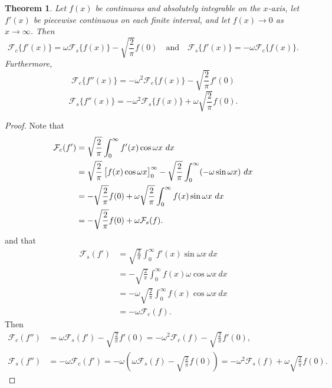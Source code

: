 \documentclass[12pt,openany]{book}
\newtheorem{theorem}{Theorem}[chapter]
\theoremstyle{definition}
\newcommand{\of}[1]{\left( #1 \right)}
\begin{document}
	\newpage
	\begin{tcolorbox}[colframe=thmcolor, title={\color{white}\bf Cosine and Sine Transforms of Derivatives}]
		\begin{theorem}
			Let \( f(x) \) be continuous and absolutely integrable on the \( x \)-axis, let \( f'(x) \) be piecewise continuous on each finite interval, and let \( f(x) \to 0 \) as \( x \to \infty \). Then
			\[
			\mathcal{F}_c \{ f'(x) \} = \omega\mathcal{F}_s \{ f(x) \} - \sqrt{\frac{2}{\pi}} f(0) \quad \text{and} \quad \mathcal{F}_s \{ f'(x) \} = -\omega\mathcal{F}_c \{ f(x) \}.
			\]
			Furthermore,
			\[
			\mathcal{F}_c \{ f''(x) \} = -\omega^2 \mathcal{F}_c \{ f(x) \} - \sqrt{\frac{2}{\pi}} f'(0)
			\]
			\[
			\mathcal{F}_s \{ f''(x) \} = -\omega^2 \mathcal{F}_s \{ f(x) \} + \omega \sqrt{\frac{2}{\pi}} f(0).
			\]
		\end{theorem}
	\end{tcolorbox}
	\begin{proof}
		Note that \begin{align*}
			\mathcal{F}_c(f')&=\sqrt{\frac{2}{\pi}}\int_0^\infty f'(x)\cos\omega x\ dx\\
			&=\sqrt{\frac{2}{\pi}}\sbr{f(x)\cos\omega x}_0^\infty - \sqrt{\frac{2}{\pi}}\int_0^\infty(-\omega\sin\omega x)\ dx\\
			&=-\sqrt{\frac{2}{\pi}}f(0)+\omega\sqrt{\frac{2}{\pi}}\int_0^\infty f(x)\sin\omega x\ dx\\
			&=-\sqrt{\frac{2}{\pi}}f(0)+\omega\mathcal{F}_s(f).
		\end{align*} and that \begin{align*}
		\mathcal{F}_s(f')&=\sqrt{\frac{2}{\pi}}\int_0^\infty f'(x)\sin\omega x\ dx\\
		&=-\sqrt{\frac{2}{\pi}}\int_0^\infty f(x)\omega\cos\omega x\ dx\\
		&=-\omega\sqrt{\frac{2}{\pi}}\int_0^\infty f(x)\cos\omega x\ dx\\
		&=-\omega\mathcal{F}_c(f).
	\end{align*} Then \begin{align*}
	\mathcal{F}_c(f'')&=\omega\mathcal{F}_s(f')-\sqrt{\frac{2}{\pi}}f'(0)
	=-\omega^2\mathcal{F}_c(f)-\sqrt{\frac{2}{\pi}}f'(0),\\
	\mathcal{F}_s(f'')&=-\omega\mathcal{F}_c(f')
	=-\omega\of{\omega\mathcal{F}_s(f)-\sqrt{\frac{2}{\pi}}f(0)}=-\omega^2\mathcal{F}_s(f)+\omega\sqrt{\frac{2}{\pi}}f(0).
\end{align*}
	\end{proof}
	\vspace{12pt}
	
\end{document}
